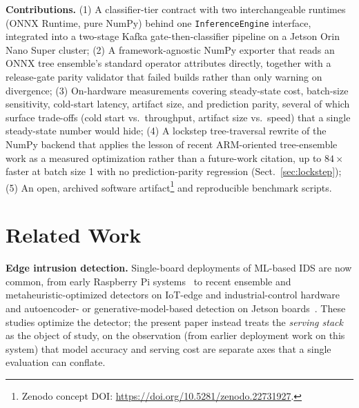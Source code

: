 \documentclass[runningheads]{llncs}
\begin{document}
\textbf{Contributions.}
(1) A classifier-tier contract with two interchangeable runtimes (ONNX Runtime, pure NumPy) behind one \texttt{InferenceEngine} interface, integrated into a two-stage Kafka gate-then-classifier pipeline on a Jetson Orin Nano Super cluster;
(2) A framework-agnostic NumPy exporter that reads an ONNX tree ensemble's standard operator attributes directly, together with a release-gate parity validator that failed builds rather than only warning on divergence;
(3) On-hardware measurements covering steady-state cost, batch-size sensitivity, cold-start latency, artifact size, and prediction parity, several of which surface trade-offs (cold start vs.\ throughput, artifact size vs.\ speed) that a single steady-state number would hide;
(4) A lockstep tree-traversal rewrite of the NumPy backend that applies the lesson of recent ARM-oriented tree-ensemble work as a measured optimization rather than a future-work citation, up to $84\times$ faster at batch size 1 with no prediction-parity regression (Sect.~\ref{sec:lockstep});
(5) An open, archived software artifact\footnote{Zenodo concept DOI: \url{https://doi.org/10.5281/zenodo.22731927}.} and reproducible benchmark scripts.

\section{Related Work}

\textbf{Edge intrusion detection.} Single-board deployments of ML-based IDS are now common, from early Raspberry Pi systems~\cite{sforzin2016rpids} to recent ensemble and metaheuristic-optimized detectors on IoT-edge and industrial-control hardware~\cite{baalaji2025ensemble,asghar2026hedid,zhang2026edgeics} and autoencoder- or generative-model-based detection on Jetson boards~\cite{hasan2025iiot,diazgorrin2026jetson}. These studies optimize the detector; the present paper instead treats the \emph{serving stack} as the object of study, on the observation (from earlier deployment work on this system) that model accuracy and serving cost are separate axes that a single evaluation can conflate.
\end{document}
